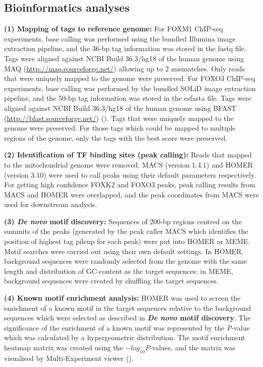 \subsection{Bioinformatics analyses}

\textbf{(1) Mapping of tags to reference genome:} For FOXM1 ChIP-seq experiments, base calling was performed using the bundled Illumina image extraction pipeline, and the 36-bp tag information was stored in the fastq file. Tags were aligned against NCBI Build 36.3/hg18 of the human genome using MAQ (\url{http://maq.sourceforge.net/}) allowing up to 2 mismatches. Only reads that were uniquely mapped to the genome were preserved. For FOXO3 ChIP-seq experiments, base calling was performed by the bundled SOLiD image extraction pipeline, and the 50-bp tag information was stored in the csfasta file. Tags were aligned against NCBI Build 36.3/hg18 of the human genome using BFAST (\url{http://bfast.sourceforge.net/}) (\cite{homer2009bfast:}). Tags that were uniquely mapped to the genome were preserved. For those tags which could be mapped to multiple regions of the genome, only the tags with the best score were preserved.

\textbf{(2) Identification of TF binding sites (peak calling):} Reads that mapped to the mitochondrial genome were removed. MACS (version 1.4.1) and HOMER (version 3.10) were used to call peaks using their default parameters respectively. For getting high confidence FOXK2 and FOXO3 peaks, peak calling results from MACS and HOMER were overlapped, and the peak coordinates from MACS were used for downstream analysis.

\textbf{(3) \textit{De novo} motif discovery:} Sequences of 200-bp regions centred on the summits of the peaks (generated by the peak caller MACS which identifies the position of highest tag pileup for each peak) were put into HOMER or MEME. Motif searches were carried out using their own default settings. In HOMER, background sequences were randomly selected from the genome with the same length and distribution of GC-content as the target sequences; in MEME, background sequences were created by shuffling the target sequences.

\textbf{(4) Known motif enrichment analysis:} HOMER was used to screen the enrichment of a known motif in the target sequences relative to the background sequences which were selected as described in \textbf{\textit{De novo} motif discovery}. The significance of the enrichment of a known motif was represented by the \textit{P}-value which was calculated by a hypergeometric distribution. The motif enrichment heatmap matrix was created using the $-log_{10}P$-values, and the matrix was visualised by Multi-Experiment viewer (\cite{saeed2003tm4:}).

